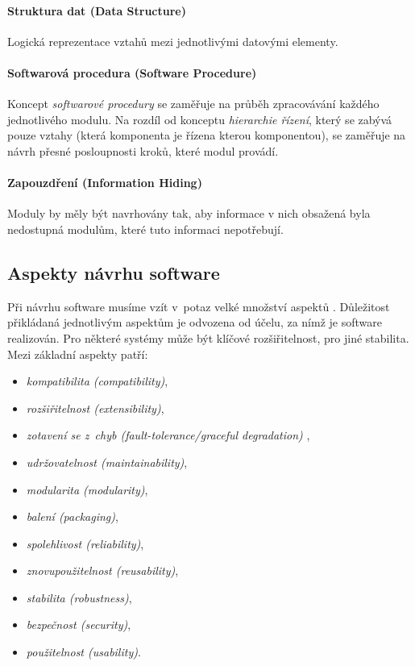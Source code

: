 \paragraph{Struktura dat (Data Structure)} Logická reprezentace vztahů mezi jednotlivými datovými elementy.

\paragraph{Softwarová procedura (Software Procedure)} Koncept \emph{softwarové procedury} se zaměřuje na průběh zpracovávání každého jednotlivého modulu. Na rozdíl od konceptu \emph{hierarchie řízení}, který se zabývá pouze vztahy (která komponenta je řízena kterou komponentou), se zaměřuje na návrh přesné posloupnosti kroků, které modul provádí.

\paragraph{Zapouzdření (Information Hiding)} Moduly by měly být navrhovány tak, aby informace v nich obsažená byla nedostupná modulům, které tuto informaci nepotřebují.

\subsection{Aspekty návrhu software}
\label{analysis-sw_design_aspects}
Při návrhu software musíme vzít v~potaz velké množství aspektů \cite{wiki:software_design}. Důležitost přikládaná jednotlivým aspektům je odvozena od účelu, za nímž je software realizován. Pro některé systémy může být klíčové rozšiřitelnost, pro jiné stabilita. Mezi základní aspekty patří:

\begin{itemize}
\item \emph{kompatibilita (compatibility)},
\item \emph{rozšiřitelnost (extensibility)},
\item \emph{zotavení se z~chyb (fault-tolerance/graceful degradation)} \cite{wiki:fault-tolerance},
\item \emph{udržovatelnost (maintainability)},
\item \emph{modularita (modularity)},
\item \emph{balení (packaging)},
\item \emph{spolehlivost (reliability)},
\item \emph{znovupoužitelnost (reusability)},
\item \emph{stabilita (robustness)},
\item \emph{bezpečnost (security)},
\item \emph{použitelnost (usability)}.
\end{itemize}

